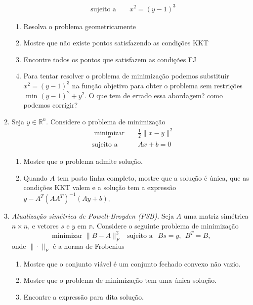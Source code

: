 \documentclass[a4paper,latin]{article}
\begin{document}
\begin{enumerate}
\begin{equation*}
\begin{aligned}
   & \text{sujeito a }
   & & x^2=(y-1)^3
   \end{aligned}
   \end{equation*} 
    \begin{enumerate}
     \item Resolva o problema geometricamente
     \item Mostre que não existe pontos satisfazendo as condições KKT
     \item Encontre todos os pontos que satisfazem as condições FJ
     \item Para tentar resolver o problema de minimização podemos substituir 
     $x^{2}=(y-1)^3$ na função objetivo para obter o problema sem restrições 
     $\text{ min }
     (y-1)^2+y^2$.
     O que tem de errado essa abordagem? 
     como podemos corrigir?
    \end{enumerate}
    \item Seja $y \in \mathbb{R}^{n}$. Considere o problema de minimização
       \begin{equation*}
      \begin{aligned}
      & \underset{x}{\text{ minimizar }}
      & & \frac{1}{2}\|x-y\|^2 \\
      & \text{sujeito a }
      & & Ax+b=0
      \end{aligned}
      \end{equation*}
      \begin{enumerate}
      	\item Mostre que o problema admite solução. 
      	\item Quando $A$ tem posto linha completo, mostre que a solução é única, que as condições KKT valem  e a solução tem a expressão $y-A^{T}(AA^{T})^{-1}(Ay+b)$.
      \end{enumerate}
    \item {\it Atualização simétrica de Powell-Broyden (PSB).} Seja $A$ uma matriz simétrica $n \times n$, e vetores $s$ e $y$
    em $\mathbb{n}$.
    Considere o seguinte problema de minimização
    $$ \text{ minimizar } \|B-A\|^{2}_{F} \ \ 
    \text{ sujeito a } \ \ Bs=y , \ \ B^{T}=B,  $$
    onde $\|\cdot\|_{F}$ é a norma de Frobenius 
      \begin{enumerate}
      	\item Mostre que o conjunto viável é um conjunto fechado convexo não vazio.
    	\item Mostre que o problema de minimização tem uma única solução.
    	\item Encontre a expressão para dita solução. 

\end{enumerate}
\end{enumerate}
\end{document}
